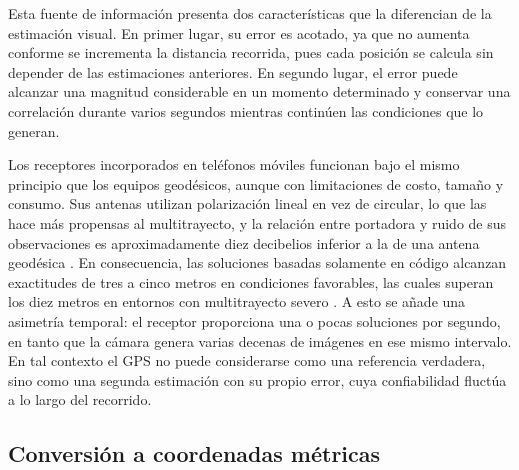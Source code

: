 Esta fuente de información presenta dos características que la diferencian de la estimación visual.
En primer lugar, su error es acotado, ya que no aumenta conforme se incrementa la distancia recorrida, pues cada posición se calcula sin depender de las estimaciones anteriores.
En segundo lugar, el error puede alcanzar una magnitud considerable en un momento determinado y conservar una correlación durante varios segundos mientras continúen las condiciones que lo generan.

Los receptores incorporados en teléfonos móviles funcionan bajo el mismo principio que los equipos geodésicos, aunque con limitaciones de costo, tamaño y consumo.
Sus antenas utilizan polarización lineal en vez de circular, lo que las hace más propensas al multitrayecto, y la relación entre portadora y ruido de sus observaciones es aproximadamente diez decibelios inferior a la de una antena geodésica \cite{zangenehnejad2021smartphone}.
En consecuencia, las soluciones basadas solamente en código alcanzan exactitudes de tres a cinco metros en condiciones favorables, las cuales superan los diez metros en entornos con multitrayecto severo \cite{zangenehnejad2021smartphone}.
A esto se añade una asimetría temporal: el receptor proporciona una o pocas soluciones por segundo, en tanto que la cámara genera varias decenas de imágenes en ese mismo intervalo.
En tal contexto el GPS no puede considerarse como una referencia verdadera, sino como una segunda estimación con su propio error, cuya confiabilidad fluctúa a lo largo del recorrido.

\subsection{Conversión a coordenadas métricas}


